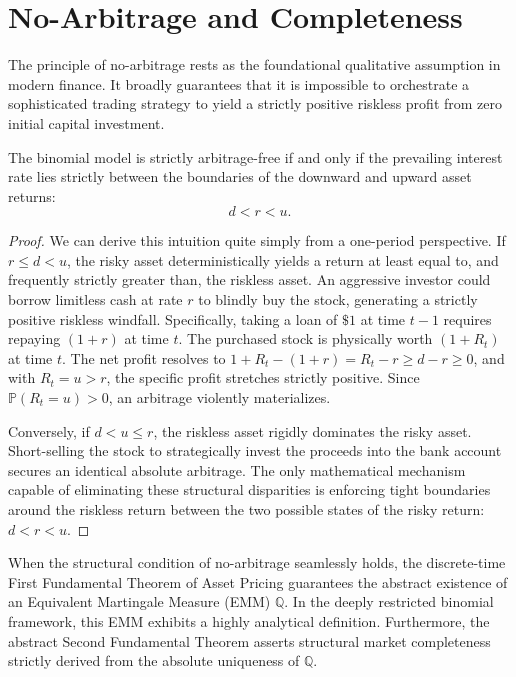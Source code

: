 \section{No-Arbitrage and Completeness}

The principle of no-arbitrage rests as the foundational qualitative assumption in modern finance. It broadly guarantees that it is impossible to orchestrate a sophisticated trading strategy to yield a strictly positive riskless profit from zero initial capital investment.

\begin{theorem}
    The binomial model is strictly arbitrage-free if and only if the prevailing interest rate lies strictly between the boundaries of the downward and upward asset returns:
    \begin{equation}
        d < r < u. \label{eq:no_arb_condition}
    \end{equation}
\end{theorem}

\begin{proof}
    We can derive this intuition quite simply from a one-period perspective. If $r \leq d < u$, the risky asset deterministically yields a return at least equal to, and frequently strictly greater than, the riskless asset. An aggressive investor could borrow limitless cash at rate $r$ to blindly buy the stock, generating a strictly positive riskless windfall. Specifically, taking a loan of $\$1$ at time $t-1$ requires repaying $(1+r)$ at time $t$. The purchased stock is physically worth $(1+R_t)$ at time $t$. The net profit resolves to $1+R_t - (1+r) = R_t - r \geq d - r \geq 0$, and with $R_t = u > r$, the specific profit stretches strictly positive. Since $\mathbb{P}(R_t=u) > 0$, an arbitrage violently materializes.
    
    Conversely, if $d < u \leq r$, the riskless asset rigidly dominates the risky asset. Short-selling the stock to strategically invest the proceeds into the bank account secures an identical absolute arbitrage. The only mathematical mechanism capable of eliminating these structural disparities is enforcing tight boundaries around the riskless return between the two possible states of the risky return: $d < r < u$.
\end{proof}

When the structural condition of no-arbitrage seamlessly holds, the discrete-time First Fundamental Theorem of Asset Pricing guarantees the abstract existence of an Equivalent Martingale Measure (EMM) $\mathbb{Q}$. In the deeply restricted binomial framework, this EMM exhibits a highly analytical definition. Furthermore, the abstract Second Fundamental Theorem asserts structural market completeness strictly derived from the absolute uniqueness of $\mathbb{Q}$.

